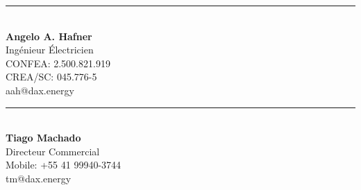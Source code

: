 \documentclass[a4paper]{article}
\begin{document}
	\noindent %
	\begin{minipage}[t]{0.5\textwidth} %
		\centering %
		\vspace{5cm} %
		\rule{6cm}{0.4pt}\\ %
		\textbf{Angelo A. Hafner}\\ %
		Ingénieur Électricien\\ %
		CONFEA: 2.500.821.919\\ %
		CREA/SC: 045.776-5\\ %
		aah@dax.energy %
	\end{minipage}%
	\hfill %
	\begin{minipage}[t]{0.5\textwidth} %
		\centering %
		\vspace{5cm} %
		\rule{6cm}{0.4pt}\\ %
		\textbf{Tiago Machado}\\ %
		Directeur Commercial\\ %
		Mobile: +55 41 99940-3744\\ %
		tm@dax.energy %
	\end{minipage}
	
\end{document}
